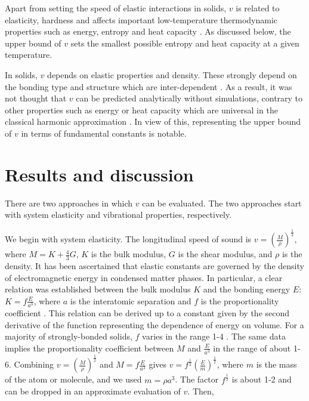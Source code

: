 \documentclass[aps,prl,groupedaddress,fleqn,twocolumn,10pt]{revtex4}
\begin{document}
Apart from setting the speed of elastic interactions in solids, $v$ is related to elasticity, hardness and affects important low-temperature thermodynamic properties such as energy, entropy and heat capacity \cite{landau}. As discussed below, the upper bound of $v$ sets the smallest possible entropy and heat capacity at a given temperature.

In solids, $v$ depends on elastic properties and density. These strongly depend on the bonding type and structure which are inter-dependent \cite{phillips}. As a result, it was not thought that $v$ can be predicted analytically without simulations, contrary to other properties such as energy or heat capacity which are universal in the classical harmonic approximation \cite{landau}. In view of this, representing the upper bound of $v$ in terms of fundamental constants is notable.

\section{Results and discussion}

There are two approaches in which $v$ can be evaluated. The two approaches start with system elasticity and vibrational properties, respectively.

We begin with system elasticity. The longitudinal speed of sound is $v=\left({\frac{M}{\rho}}\right)^{\frac{1}{2}}$, where $M=K+\frac{4}{3}G$, $K$ is the bulk modulus, $G$ is the shear modulus, and $\rho$ is the density. It has been ascertained that elastic constants are governed by the density of electromagnetic energy in condensed matter phases. In particular, a clear relation was established between the bulk modulus $K$ and the bonding energy $E$: $K=f\frac{E}{a^3}$, where $a$ is the interatomic separation and $f$ is the proportionality coefficient \cite{diamond,diamond1}. This relation can be derived up to a constant given by the second derivative of the function representing the dependence of energy on volume. For a majority of strongly-bonded solids, $f$ varies in the range 1-4 \cite{diamond,diamond1}. The same data implies the proportionality coefficient between $M$ and $\frac{E}{a^3}$ in the range of about 1-6. Combining $v=\left({\frac{M}{\rho}}\right)^{\frac{1}{2}}$ and $M=f\frac{E}{a^3}$ gives $v=f^{\frac{1}{2}}\left(\frac{E}{m}\right)^{\frac{1}{2}}$, where $m$ is the mass of the atom or molecule, and we used $m=\rho a^3$. The factor $f^{\frac{1}{2}}$ is about 1-2 and can be dropped in an approximate evaluation of $v$. Then,
\end{document}
